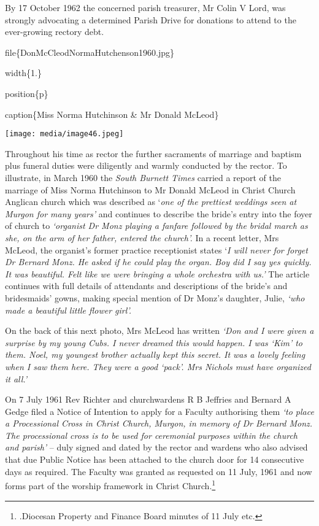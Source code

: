 By 17 October 1962 the concerned parish treasurer, Mr Colin V Lord, was strongly advocating a determined Parish Drive for donations to attend to the ever-growing rectory debt.

file\{DonMcCleodNormaHutchenson1960.jpg\}

width\{1.\}

position\{p\}

caption\{Miss Norma Hutchinson \& Mr Donald McLeod\}

\texttt{[image: media/image46.jpeg]}

Throughout his time as rector the further sacraments of marriage and baptism plus funeral duties were diligently and warmly conducted by the rector. To illustrate, in March 1960 the \emph{South Burnett Times} carried a report of the marriage of Miss Norma Hutchinson to Mr Donald McLeod in Christ Church Anglican church which was described as `\emph{one of the prettiest weddings seen at Murgon for many years'} and continues to describe the bride's entry into the foyer of church to \emph{`organist Dr Monz playing a fanfare followed by the bridal march as she, on the arm of her father, entered the church'.} In a recent letter, Mrs McLeod, the organist's former practice receptionist states `\emph{I will never for forget Dr Bernard Monz. He asked if he could play the organ. Boy did I say yes quickly. It was beautiful. Felt like we were bringing a whole orchestra with us.'} The article continues with full details of attendants and descriptions of the bride's and bridesmaids' gowns, making special mention of Dr Monz's daughter, Julie, \emph{`who made a beautiful little flower girl'.}

On the back of this next photo, Mrs McLeod has written \emph{`Don and I were given a surprise by my young Cubs. I never dreamed this would happen. I was `Kim' to them. Noel, my youngest brother actually kept this secret. It was a lovely feeling when I saw them here. They were a good `pack'. Mrs Nichols must have organized it all.'}

On 7 July 1961 Rev Richter and churchwardens R B Jeffries and Bernard A Gedge filed a Notice of Intention to apply for a Faculty authorising them \emph{`to place a Processional Cross in Christ Church, Murgon, in memory of Dr Bernard Monz. The processional cross is to be used for ceremonial purposes within the church and parish'} -- duly signed and dated by the rector and wardens who also advised that due Public Notice has been attached to the church door for 14 consecutive days as required. The Faculty was granted as requested on 11 July, 1961 and now forms part of the worship framework in Christ Church.\footnote{.Diocesan Property and Finance Board minutes of 11 July etc.}

